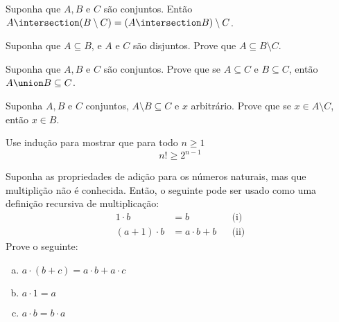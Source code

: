 \begin{exercise}
	Suponha que $A, B$ e $C$ são conjuntos. Então $A \intersection (B \setminus C) = (A \intersection B) \setminus C$.
\end{exercise}

\begin{exercise}
    Suponha que $A \subseteq B$, e $A$ e $C$ são disjuntos. Prove que $A \subseteq B \setminus C$.
\end{exercise}

\begin{exercise}
	Suponha que $A, B$ e $C$ são conjuntos. Prove que se $A \subseteq C$ e $B \subseteq C$, então $A \union B \subseteq C$.
\end{exercise}

\begin{exercise}
	Suponha $A, B$ e $C$ conjuntos, $A \setminus B \subseteq C$ e $x$ arbitrário. Prove que se $x \in A \setminus C$, então $x \in B$.
\end{exercise}

\begin{exercise}
	Use indução para mostrar que para todo $n \geq 1$
	$$
	n! \geq 2^{n - 1} 
	$$
\end{exercise}

\begin{exercise}
	Suponha as propriedades de adição para os números naturais, mas que multiplição não é conhecida. Então, o seguinte pode ser usado como uma definição recursiva de multiplicação:
	$$
        \begin{aligned}
		    1 \cdot b &= b &&\text{(i)}\\
		    (a + 1) \cdot b &= a \cdot b + b &&\text{(ii)}
        \end{aligned}
	$$
	Prove o seguinte:
	\begin{enumerate}[(a)]
		\item $a \cdot (b + c) = a \cdot b + a \cdot c$
		\item $a \cdot 1 = a$
		\item $a \cdot b = b \cdot a$
	\end{enumerate}
\end{exercise}
